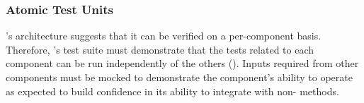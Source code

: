 \subsubsection{Atomic Test Units}\label{sec:sys-nf-atomic}
\progname{}'s architecture suggests that it can be verified on a per-component
basis. Therefore, \progname{}'s test suite must demonstrate that the tests
related to each component can be run independently of the others
(). Inputs required from other components must be mocked to
demonstrate the component's ability to operate as expected to build confidence
in its ability to integrate with non-\progname{} methods.